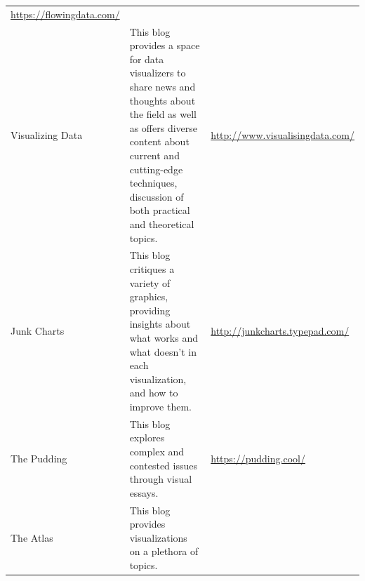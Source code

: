 \documentclass[]{book}
\theoremstyle{definition}
\theoremstyle{definition}
\theoremstyle{definition}
\theoremstyle{remark}
\begin{document}
\begin{longtable}[]{@{}lll@{}}
\begin{minipage}[t]{0.11\columnwidth}
\url{https://flowingdata.com/}\strut
\end{minipage}\tabularnewline
\begin{minipage}[t]{0.11\columnwidth}\raggedright\strut
Visualizing Data\strut
\end{minipage} & \begin{minipage}[t]{0.20\columnwidth}\raggedright\strut
This blog provides a space for data visualizers to share news and
thoughts about the field as well as offers diverse content about current
and cutting-edge techniques, discussion of both practical and
theoretical topics.\strut
\end{minipage} & \begin{minipage}[t]{0.11\columnwidth}\raggedright\strut
\url{http://www.visualisingdata.com/}\strut
\end{minipage}\tabularnewline
\begin{minipage}[t]{0.11\columnwidth}\raggedright\strut
Junk Charts\strut
\end{minipage} & \begin{minipage}[t]{0.20\columnwidth}\raggedright\strut
This blog critiques a variety of graphics, providing insights about what
works and what doesn't in each visualization, and how to improve
them.\strut
\end{minipage} & \begin{minipage}[t]{0.11\columnwidth}\raggedright\strut
\url{http://junkcharts.typepad.com/}\strut
\end{minipage}\tabularnewline
\begin{minipage}[t]{0.11\columnwidth}\raggedright\strut
The Pudding\strut
\end{minipage} & \begin{minipage}[t]{0.20\columnwidth}\raggedright\strut
This blog explores complex and contested issues through visual
essays.\strut
\end{minipage} & \begin{minipage}[t]{0.11\columnwidth}\raggedright\strut
\url{https://pudding.cool/}\strut
\end{minipage}\tabularnewline
\begin{minipage}[t]{0.11\columnwidth}\raggedright\strut
The Atlas\strut
\end{minipage} & \begin{minipage}[t]{0.20\columnwidth}\raggedright\strut
This blog provides visualizations on a plethora of topics.\strut
\end{minipage} & \begin{minipage}[t]{0.11\columnwidth}\raggedright\strut

\end{minipage}
\end{longtable}
\end{document}
